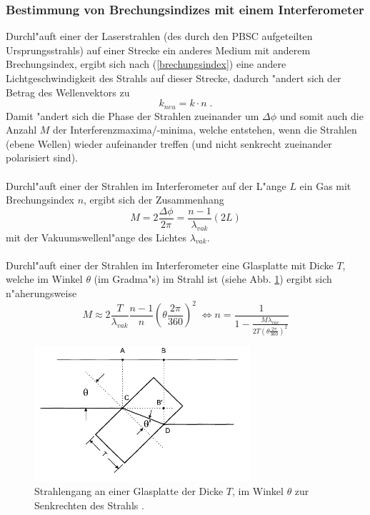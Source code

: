     \subsubsection{Bestimmung von Brechungsindizes mit einem Interferometer}
      Durchl"auft einer der Laserstrahlen (des durch den PBSC aufgeteilten Ursprungsstrahls) auf einer Strecke ein anderes Medium mit anderem Brechungsindex, ergibt sich nach (\ref{brechungsindex}) eine andere Lichtgeschwindigkeit des Strahls auf dieser Strecke, dadurch "andert sich der Betrag des Wellenvektors zu
      \begin{equation}
        k_{neu}=k \cdot n \; .
      \end{equation}
      Damit "andert sich die Phase der Strahlen zueinander um $\Delta \phi$ und somit auch die Anzahl $M$ der Interferenzmaxima/-minima, welche entstehen, wenn die Strahlen (ebene Wellen) wieder aufeinander treffen (und nicht senkrecht zueinander polarisiert sind).\\
      \\Durchl"auft einer der Strahlen im Interferometer auf der L"ange $L$ ein Gas mit Brechungsindex $n$, ergibt sich der Zusammenhang
      \begin{equation}
        M=2\frac{\Delta \phi}{2 \pi}=\frac{n-1}{\lambda_{vak}}(2L)
        \label{gas}
      \end{equation}
      mit der Vakuumswellenl"ange des Lichtes $\lambda_{vak}$.\\
      \\Durchl"auft einer der Strahlen im Interferometer eine Glasplatte mit Dicke $T$, welche im Winkel $\theta$ (im Gradma"s) im Strahl ist (siehe Abb. \ref{fig:glasplatte}) ergibt sich n"aherungsweise
      \begin{equation}
        M \approx 2\frac{T}{\lambda_{vak}} \frac{n-1}{n}\left(\theta \frac{2\pi}{360}\right)^2 \;
        \iff n = \frac{1}{1-\frac{M\lambda_{vac}}{2T\left(\theta\frac{2\pi}{360}\right)^2}}
        \label{glas}
      \end{equation}
      \begin{figure}[H]
        \centering
        \includegraphics[height=5cm]{bilder/glasplatte.png}
        \caption{Strahlengang an einer Glasplatte der Dicke $T$, im Winkel $\theta$ zur Senkrechten des Strahls \cite{Anleitung}.}
        \label{fig:glasplatte}
      \end{figure}
